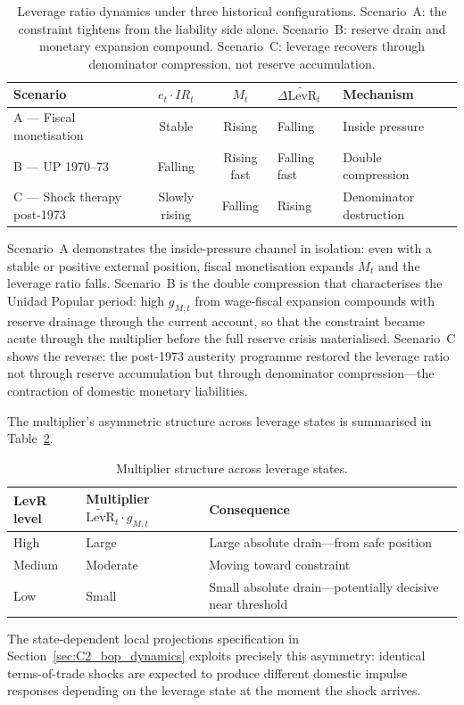 \begin{table}[h]
\centering
\small
\begin{tabular}{lccll}
\toprule
Scenario & $e_t \cdot IR_t$ & $M_t$ &
  $\Delta\widetilde{\text{LevR}}_t$ & Mechanism \\
\midrule
A --- Fiscal monetisation
  & Stable & Rising & Falling & Inside pressure \\
B --- UP 1970--73
  & Falling & Rising fast & Falling fast & Double compression \\
C --- Shock therapy post-1973
  & Slowly rising & Falling & Rising & Denominator destruction \\
\bottomrule
\end{tabular}
\caption{Leverage ratio dynamics under three historical configurations.
Scenario~A: the constraint tightens from the liability side alone.
Scenario~B: reserve drain and monetary expansion compound.
Scenario~C: leverage recovers through denominator compression, not
reserve accumulation.}
\label{app:tab:scenarios}
\end{table}

Scenario~A demonstrates the inside-pressure channel in isolation: even
with a stable or positive external position, fiscal monetisation expands
$M_t$ and the leverage ratio falls. Scenario~B is the double compression
that characterises the Unidad Popular period: high $g_{M,t}$ from
wage-fiscal expansion compounds with reserve drainage through the current
account, so that the constraint became acute through the multiplier before
the full reserve crisis materialised. Scenario~C shows the reverse: the
post-1973 austerity programme restored the leverage ratio not through
reserve accumulation but through denominator compression---the contraction
of domestic monetary liabilities.

The multiplier's asymmetric structure across leverage states is summarised
in Table~\ref{app:tab:multiplier}.

\begin{table}[h]
\centering
\small
\begin{tabular}{lll}
\toprule
LevR level & Multiplier
  $\widetilde{\text{LevR}}_t \cdot g_{M,t}$ & Consequence \\
\midrule
High   & Large    & Large absolute drain---from safe position \\
Medium & Moderate & Moving toward constraint \\
Low    & Small    & Small absolute drain---potentially decisive
                    near threshold \\
\bottomrule
\end{tabular}
\caption{Multiplier structure across leverage states.}
\label{app:tab:multiplier}
\end{table}

The state-dependent local projections specification in
Section~\ref{sec:C2_bop_dynamics} exploits precisely this asymmetry:
identical terms-of-trade shocks are expected to produce different domestic
impulse responses depending on the leverage state at the moment the shock
arrives.
